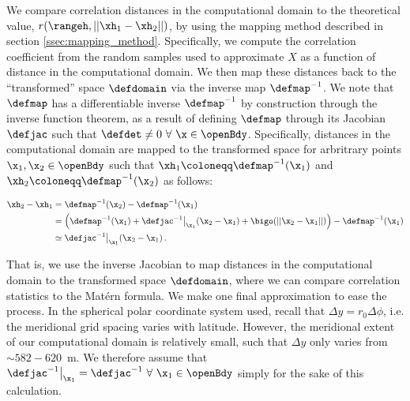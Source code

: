 We compare correlation distances in the computational domain to the
theoretical value, $r(\rangeh,||\xh_1-\xh_2||)$, by using the mapping method described in
section \ref{ssec:mapping_method}.
Specifically, we compute the correlation coefficient from the random samples
used to approximate $X$ as a function of distance in the computational domain.
We then map these distances back to the ``transformed'' space $\defdomain$ via
the inverse map $\defmap^{-1}$.
We note that $\defmap$ has a differentiable inverse $\defmap^{-1}$ by construction
through the inverse function theorem,
as a result of defining $\defmap$ through its Jacobian $\defjac$ such that
$\defdet \neq 0 \,\,\forall \,\,\x\in\openBdy$.
Specifically, distances in the computational domain are mapped to the
transformed space for arbritrary points $\x_1,\x_2\in\openBdy$ such that
$\xh_1\coloneqq\defmap^{-1}(\x_1)$ and $\xh_2\coloneqq \defmap^{-1}(\x_2)$ as
follows:
\begin{linenomath*}\begin{equation*}
    \begin{aligned}
        \xh_2 - \xh_1 &= \defmap^{-1}(\x_2) - \defmap^{-1}(\x_1) \\
                      &= \left(
                            \defmap^{-1}(\x_1) +
                            \defjac^{-1}\big|_{\x_{1}}(\x_2-\x_1) +
                            \bigo( ||\x_2-\x_1|| )
                        \right) - \defmap^{-1}(\x_1) \\
                        &\simeq \defjac^{-1}\big|_{\x_{1}}(\x_2-\x_1) \, .
    \end{aligned}
    \label{eq:matern_correlation_iso}
\end{equation*}\end{linenomath*}
That is, we use the inverse Jacobian to map distances in the computational domain to the
transformed space $\defdomain$, where we can compare correlation statistics to
the Mat\'ern formula.
We make one final approximation to ease the process.
In the spherical polar coordinate system used, recall that
$\Delta y = r_0 \Delta \phi$, i.e. the meridional grid spacing varies with
latitude.
However, the meridional extent of our computational domain is relatively small,
such that $\Delta y$ only varies from $\sim 582-620$~m.
We therefore assume that
$\defjac^{-1}\big|_{\x_{1}} =\defjac^{-1}\,\,\forall\,\,\x_1\in\openBdy$
simply for the sake of this calculation.

